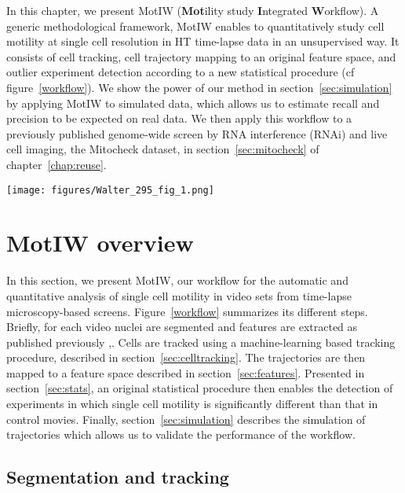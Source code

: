 In this chapter, we present MotIW (\textbf{Mot}ility study \textbf{I}ntegrated \textbf{W}orkflow). A generic methodological framework, MotIW enables to quantitatively study cell motility at single cell resolution in HT time-lapse data in an unsupervised way. It consists of cell tracking, cell trajectory mapping to an original feature space, and outlier experiment detection according to a new statistical procedure (cf figure~\ref{workflow}). We show the power of our method in section~\ref{sec:simulation} by applying MotIW to simulated data, which allows us to estimate recall and precision to be expected on real data. We then apply this workflow to a previously published genome-wide screen by RNA interference (RNAi) and live cell imaging, the Mitocheck dataset, in section~\ref{sec:mitocheck} of chapter~\ref{chap:reuse}.

\begin{figure*}[ht]
\centerline{\texttt{[image: figures/Walter\_295\_fig\_1.png]}}
\caption{Overview of MotIW}
\label{workflow}
\end{figure*}  

\section{MotIW overview}
\label{sec:workflow}
In this section, we present MotIW, our workflow for the automatic and
quantitative analysis of single cell motility in video sets from
time-lapse microscopy-based screens. Figure~\ref{workflow} summarizes
its different steps. 
Briefly, for each video nuclei are segmented and features are
extracted as published previously \cite{Walter2010},\cite{cellcognition}. Cells are tracked using a
machine-learning based tracking procedure, described in
section~\ref{sec:celltracking}. The trajectories are then mapped to a
feature space described in section~\ref{sec:features}. Presented in
section~\ref{sec:stats}, an original statistical procedure then
enables the detection of experiments in which single cell motility is
significantly different than that in control movies. Finally,
section~\ref{sec:simulation} describes the simulation of trajectories
which allows us to validate the performance of the workflow.

\subsection{Segmentation and tracking}
\label{sec:motiw_seg}
\label{sec:celltracking}

